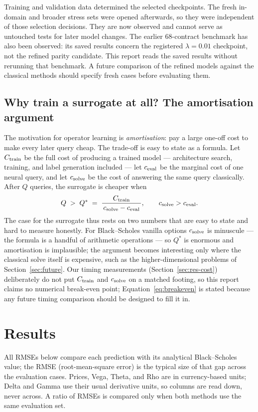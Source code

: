 \documentclass[11pt,a4paper]{article}
\begin{document}
Training and validation data determined the selected checkpoints. The fresh in-domain and broader stress sets were opened afterwards, so they were independent of those selection decisions. They are now observed and cannot serve as untouched tests for later model changes. The earlier 68-contract benchmark has also been observed: its saved results concern the registered $\lambda=0.01$ checkpoint, not the refined parity candidate. This report reads the saved results without rerunning that benchmark. A future comparison of the refined models against the classical methods should specify fresh cases before evaluating them.

\subsection{Why train a surrogate at all? The amortisation argument}
\label{sec:deeponet-amortise}

The motivation for operator learning is \emph{amortisation}: pay a large one-off cost to make every later query cheap. The trade-off is easy to state as a formula. Let $C_{\rm train}$ be the full cost of producing a trained model --- architecture search, training, and label generation included --- let $c_{\rm eval}$ be the marginal cost of one neural query, and let $c_{\rm solve}$ be the cost of answering the same query classically. After $Q$ queries, the surrogate is cheaper when
\begin{equation}
Q \;>\; Q^*\;=\;\frac{C_{\rm train}}{\,c_{\rm solve}-c_{\rm eval}\,},
\qquad c_{\rm solve}>c_{\rm eval}.
\label{eq:breakeven}
\end{equation}
The case for the surrogate thus rests on two numbers that are easy to state and hard to measure honestly. For Black--Scholes vanilla options $c_{\rm solve}$ is minuscule --- the formula is a handful of arithmetic operations --- so $Q^*$ is enormous and amortisation is implausible; the argument becomes interesting only where the classical solve itself is expensive, such as the higher-dimensional problems of Section~\ref{sec:future}. Our timing measurements (Section~\ref{sec:res-cost}) deliberately do not put $C_{\rm train}$ and $c_{\rm solve}$ on a matched footing, so this report claims no numerical break-even point; Equation~\eqref{eq:breakeven} is stated because any future timing comparison should be designed to fill it in.

\section{Results}
\label{sec:results}
All RMSEs below compare each prediction with its analytical Black--Scholes value; the RMSE (root-mean-square error) is the typical size of that gap across the evaluation cases. Prices, Vega, Theta, and Rho are in currency-based units; Delta and Gamma use their usual derivative units, so columns are read down, never across. A ratio of RMSEs is compared only when both methods use the same evaluation set.
\end{document}
